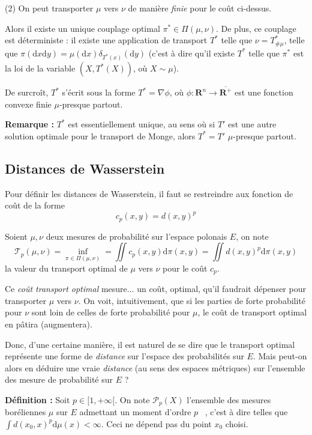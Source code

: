 \documentclass[12pt]{article}
\begin{document}
(2) On peut transporter $ \mu $ vers $ \nu $ de manière \textit{finie} pour le coût ci-dessus.

Alors il existe un unique couplage optimal $ \pi^* \in \Pi(\mu, \nu) $. De plus, ce couplage est déterministe : il existe une application de transport $T^*$ telle que $ \nu = T^*_{\# \mu} $, telle que $ \pi(\mathrm d x \mathrm d y) = \mu(\mathrm d x) \delta_{T^*(x)}(\mathrm d y) $ (c'est à dire qu'il existe $T^*$ telle que  $\pi^*$ est la loi de la variable $ (X,T^*(X)) $, où $ X\sim \mu $).

De surcroît, $ T^* $ s'écrit sous la forme $ T^* = \nabla \phi $, où $ \phi : \mathbf R^n \to \overline{\mathbf R^+}$ est une fonction convexe finie $\mu$-presque partout.

\textbf{Remarque :} $T^*$ est essentiellement unique, au sens où si $ T'$ est une autre solution optimale pour le transport de Monge, alors $ T^* = T' $ $\mu$-presque partout.

\subsection{Distances de Wasserstein}

Pour définir les distances de Wasserstein, il faut se restreindre aux fonction de coût de la forme $$ c_p(x,y) = d(x,y)^p $$

Soient $ \mu, \nu $ deux mesures de probabilité sur l'espace polonais $E$, on note $$ \mathcal T_p(\mu, \nu) = \inf_{\pi \in \Pi(\mu,\nu)} = \iint c_p(x,y) \mathrm d \pi(x,y) = \iint d(x,y)^p \mathrm d \pi(x,y) $$ la valeur du transport optimal de $ \mu $ vers $ \nu $ pour le coût $c_p$.

Ce \textit{coût transport optimal} mesure... un coût, optimal, qu'il faudrait dépenser pour transporter $ \mu $ vers $ \nu $. On voit, intuitivement, que si les parties de forte probabilité pour $ \nu $ sont loin de celles de forte probabilité pour $ \mu $, le coût de transport optimal en pâtira (augmentera).

Donc, d'une certaine manière, il est naturel de se dire que le transport optimal représente une forme de \textit{distance} sur l'espace des probabilités sur $E$. Mais peut-on alors en déduire une vraie \textit{distance} (au sens des espaces métriques) sur l'ensemble des mesure de probabilité sur $E$ ?

\textbf{Définition :} Soit $ p \in [1, +\infty [$. On note $ \mathcal P_p(X) $ l'ensemble des mesures boréliennes $\mu$ sur $E$ \og admettant un moment d'ordre $p$ \fg\, , c'est à dire telles que $ \displaystyle \int d(x_0,x)^p \mathrm d \mu(x) < \infty $. Ceci ne dépend pas du point $x_0$ choisi.
\end{document}

